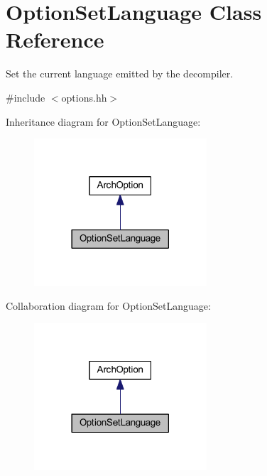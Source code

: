 \hypertarget{class_option_set_language}{}\section{Option\+Set\+Language Class Reference}
\label{class_option_set_language}


Set the current language emitted by the decompiler.  




{\ttfamily \#include $<$options.\+hh$>$}



Inheritance diagram for Option\+Set\+Language\+:
\nopagebreak
\begin{figure}[H]
\begin{center}
\leavevmode
\includegraphics[width=182pt]{class_option_set_language__inherit__graph}
\end{center}
\end{figure}


Collaboration diagram for Option\+Set\+Language\+:
\nopagebreak
\begin{figure}[H]
\begin{center}
\leavevmode
\includegraphics[width=182pt]{class_option_set_language__coll__graph}
\end{center}
\end{figure}
